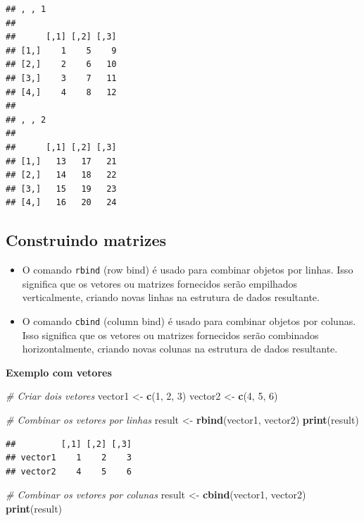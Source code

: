 \documentclass[
]{book}
\newenvironment{Shaded}{\begin{snugshade}}{\end{snugshade}}
\newcommand{\CommentTok}[1]{\textcolor[rgb]{0.56,0.35,0.01}{\textit{#1}}}
\newcommand{\DecValTok}[1]{\textcolor[rgb]{0.00,0.00,0.81}{#1}}
\newcommand{\FunctionTok}[1]{\textcolor[rgb]{0.13,0.29,0.53}{\textbf{#1}}}
\newcommand{\NormalTok}[1]{#1}
\newcommand{\OtherTok}[1]{\textcolor[rgb]{0.56,0.35,0.01}{#1}}
\begin{document}
\begin{verbatim}
## , , 1
## 
##      [,1] [,2] [,3]
## [1,]    1    5    9
## [2,]    2    6   10
## [3,]    3    7   11
## [4,]    4    8   12
## 
## , , 2
## 
##      [,1] [,2] [,3]
## [1,]   13   17   21
## [2,]   14   18   22
## [3,]   15   19   23
## [4,]   16   20   24
\end{verbatim}

\subsection{Construindo matrizes}\label{construindo-matrizes}

\begin{itemize}
\item
  O comando \texttt{rbind} (row bind) é usado para combinar objetos por linhas. Isso significa que os vetores ou matrizes fornecidos serão empilhados verticalmente, criando novas linhas na estrutura de dados resultante.
\item
  O comando \texttt{cbind} (column bind) é usado para combinar objetos por colunas. Isso significa que os vetores ou matrizes fornecidos serão combinados horizontalmente, criando novas colunas na estrutura de dados resultante.
\end{itemize}

\textbf{Exemplo com vetores}

\begin{Shaded}
\begin{Highlighting}[]
\CommentTok{\# Criar dois vetores}
\NormalTok{vector1 }\OtherTok{\textless{}{-}} \FunctionTok{c}\NormalTok{(}\DecValTok{1}\NormalTok{, }\DecValTok{2}\NormalTok{, }\DecValTok{3}\NormalTok{)}
\NormalTok{vector2 }\OtherTok{\textless{}{-}} \FunctionTok{c}\NormalTok{(}\DecValTok{4}\NormalTok{, }\DecValTok{5}\NormalTok{, }\DecValTok{6}\NormalTok{)}

\CommentTok{\# Combinar os vetores por linhas}
\NormalTok{result }\OtherTok{\textless{}{-}} \FunctionTok{rbind}\NormalTok{(vector1, vector2)}
\FunctionTok{print}\NormalTok{(result)}
\end{Highlighting}
\end{Shaded}

\begin{verbatim}
##         [,1] [,2] [,3]
## vector1    1    2    3
## vector2    4    5    6
\end{verbatim}

\begin{Shaded}
\begin{Highlighting}[]
\CommentTok{\# Combinar os vetores por colunas}
\NormalTok{result }\OtherTok{\textless{}{-}} \FunctionTok{cbind}\NormalTok{(vector1, vector2)}
\FunctionTok{print}\NormalTok{(result)}
\end{Highlighting}
\end{Shaded}
\end{document}
